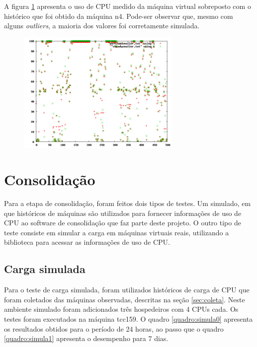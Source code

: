 A figura \ref{fig:simworkload} apresenta o uso de CPU medido da máquina virtual
sobreposto com o histórico que foi obtido da máquina n4. Pode-ser observar que,
mesmo com alguns \emph{outliers}, a maioria dos valores foi corretamente
simulada.

\begin{figure}
\centering
\includegraphics[width=0.7\textwidth]{src/test-data/checking-load-simulator/load-simulator-n4.png}
\label{fig:simworkload}
\end{figure}

\section{Consolidação}

Para a etapa de consolidação, foram feitos dois tipos de testes. Um simulado, em
que históricos de máquinas são utilizados para fornecer informações de uso de
CPU ao software de consolidação que faz parte deste projeto. O outro tipo de
teste consiste em simular a carga em máquinas virtuais reais, utilizando a
biblioteca \libvirt{} para acessar as informações de uso de CPU.

\subsection{Carga simulada}

Para o teste de carga simulada, foram utilizados históricos de carga de CPU que
foram coletados das máquinas observadas, descritas na seção \ref{sec:coleta}.
Neste ambiente simulado foram adicionados três hospedeiros com 4 CPUs cada. Os
testes foram executados na máquina tcc159. O quadro \ref{quadro:simula0}
apresenta os resultados obtidos para o período de 24 horas, ao passo que o
quadro \ref{quadro:simula1} apresenta o desempenho para 7 dias.

